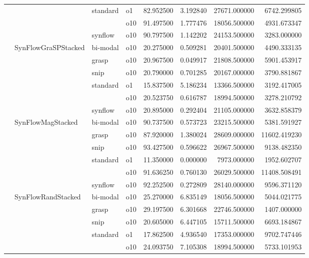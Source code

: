 \begin{longtable}{llllrrrr}
      &     & standard & o1 &  82.952500 &   3.192840 &     27671.000000 &   6742.299805 \\
      &     &         & o10 &  91.497500 &   1.777476 &     18056.500000 &   4931.673347 \\
      &     & synflow & o10 &  90.797500 &   1.142202 &     24153.500000 &   3283.000000 \\
      & SynFlowGraSPStacked & bi-modal & o10 &  20.275000 &   0.509281 &     20401.500000 &   4490.333135 \\
      &     & grasp & o10 &  20.967500 &   0.049917 &     21808.500000 &   5901.453917 \\
      &     & snip & o10 &  20.790000 &   0.701285 &     20167.000000 &   3790.881867 \\
      &     & standard & o1 &  15.837500 &   5.186234 &     13366.500000 &   3192.417005 \\
      &     &         & o10 &  20.523750 &   0.616787 &     18994.500000 &   3278.210792 \\
      &     & synflow & o10 &  20.895000 &   0.292404 &     21105.000000 &   3632.858379 \\
      & SynFlowMagStacked & bi-modal & o10 &  90.737500 &   0.573723 &     23215.500000 &   5381.591927 \\
      &     & grasp & o10 &  87.920000 &   1.380024 &     28609.000000 &  11602.419230 \\
      &     & snip & o10 &  93.427500 &   0.596622 &     26967.500000 &   9138.482350 \\
      &     & standard & o1 &  11.350000 &   0.000000 &      7973.000000 &   1952.602707 \\
      &     &         & o10 &  91.636250 &   0.760130 &     26029.500000 &  11408.508491 \\
      &     & synflow & o10 &  92.252500 &   0.272809 &     28140.000000 &   9596.371120 \\
      & SynFlowRandStacked & bi-modal & o10 &  25.270000 &   6.835149 &     18056.500000 &   5044.021775 \\
      &     & grasp & o10 &  29.197500 &   6.301668 &     22746.500000 &   1407.000000 \\
      &     & snip & o10 &  20.605000 &   6.447105 &     15711.500000 &   6693.184867 \\
      &     & standard & o1 &  17.862500 &   4.936540 &     17353.000000 &   9702.747446 \\
      &     &         & o10 &  24.093750 &   7.105308 &     18994.500000 &   5733.101953 \\

\end{longtable}

